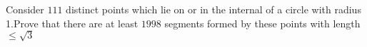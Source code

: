 Consider $111$ distinct points which lie on or in the internal of a circle with radius 1.Prove that there are at least $1998$ segments formed by these points with length $\leq \sqrt{3}$